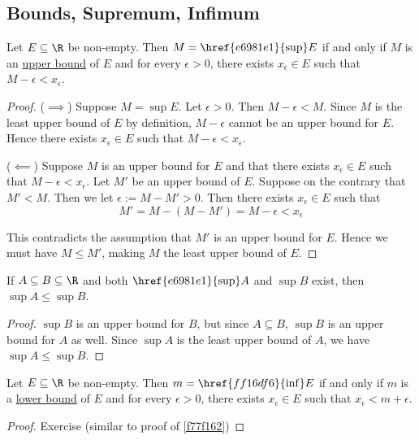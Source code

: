 \subsection{Bounds, Supremum, Infimum}\label{ba78d71}

\Lemma{}\label{f77f162}

Let $E\subseteq\R$ be non-empty. Then $M=\href{e6981e1}{\sup}E$ if and only if
$M$ is an \href{e4698be}{upper bound} of $E$ and for every $\epsilon>0$, there
exists $x_\epsilon\in E$ such that $M-\epsilon<x_\epsilon$.

\begin{proof}
  ($\implies$) Suppose $M=\sup E$. Let $\epsilon>0$. Then $M-\epsilon<M$. Since
  $M$ is the least upper bound of $E$ by definition, $M-\epsilon$ cannot be an
  upper bound for $E$. Hence there exists $x_\epsilon\in E$ such that
  $M-\epsilon<x_\epsilon$.

  ($\impliedby$) Suppose $M$ is an upper bound for $E$ and that there exists
  $x_\epsilon\in E$ such that $M-\epsilon<x_\epsilon$. Let $M'$ be an upper
  bound of $E$. Suppose on the contrary that $M'<M$. Then we let
  $\epsilon:=M-M'>0$. Then there exists $x_\epsilon\in E$ such that
  $$
    M'=M-(M-M')=M-\epsilon<x_\epsilon
  $$

  This contradicts the assumption that $M'$ is an upper bound for $E$. Hence we
  must have $M\leq M'$, making $M$ the least upper bound of $E$.
\end{proof}

\Lemma{}\label{cd8e7c5}

If $A\subseteq B\subseteq\R$ and both $\href{e6981e1}{\sup}A$ and $\sup B$
exist, then $\sup A\leq\sup B$.

\begin{proof}
  $\sup B$ is an upper bound for $B$, but since $A\subseteq B$, $\sup B$ is an
  upper bound for $A$ as well. Since $\sup A$ is the least upper bound of $A$,
  we have $\sup A\leq\sup B$.
\end{proof}

\Lemma{}\label{fec9bdb}

Let $E\subseteq\R$ be non-empty. Then $m=\href{ff16df6}{\inf}E$ if and only if
$m$ is a \href{e4698be}{lower bound} of $E$ and for every $\epsilon>0$, there
exists $x_\epsilon\in E$ such that $x_\epsilon<m+\epsilon$.

\begin{proof}
  Exercise (similar to proof of \autoref{f77f162})
\end{proof}

